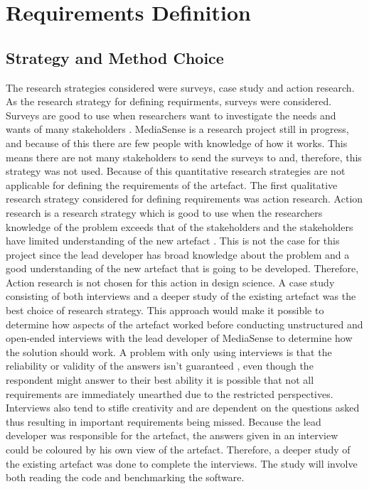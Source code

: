 \section{Requirements Definition}
\subsection{Strategy and Method Choice}
The research strategies considered were surveys, case study and action research. As the research strategy for defining requirments, surveys were considered. Surveys are good to use when researchers want to investigate the needs and wants of many stakeholders \cite{johannesson2012design}. MediaSense is a research project still in progress, and because of this there are few people with knowledge of how it works. This means there are not many stakeholders to send the surveys to and, therefore, this strategy was not used. Because of this quantitative research strategies are not applicable for defining the requirements of the artefact. 
The first qualitative research strategy considered for defining requirements was action research. Action research is a research strategy which is good to use when the researchers knowledge of the problem exceeds that of the stakeholders and the stakeholders have limited understanding of the new artefact \cite{johannesson2012design}. This is not the case for this project since the lead developer has broad knowledge about the problem and a good understanding of the new artefact that is going to be developed. Therefore, Action research is not chosen for this action in design science. A case study consisting of both interviews and a deeper study of the existing artefact was the best choice of research strategy. This approach would make it possible to determine how aspects of the artefact worked before conducting unstructured and open-ended interviews with the lead developer of MediaSense to determine how the solution should work. A problem with only using interviews is that the reliability or validity of the answers isn't guaranteed \cite{golafshani2003understanding}, even though the respondent might answer to their best ability it is possible that not all requirements are immediately unearthed due to the restricted perspectives. Interviews also tend to stifle creativity and are dependent on the questions asked \cite{johannesson2012design} thus resulting in important requirements being missed. Because the lead developer was responsible for the artefact, the answers given in an interview could be coloured by his own view of the artefact. Therefore, a deeper study of the existing artefact was done to complete the interviews. The study will involve both reading the code and benchmarking the software.

